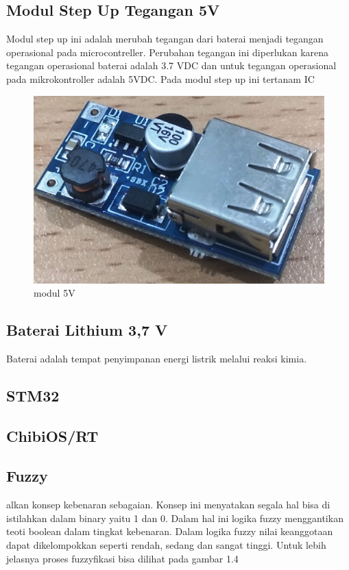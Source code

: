 \documentclass[11pt]{article}
\begin{document}
\subsection{Modul Step Up Tegangan 5V}
Modul step up ini adalah merubah tegangan dari baterai menjadi tegangan operasional pada microcontreller.
Perubahan tegangan ini diperlukan karena tegangan operasional baterai adalah 3.7 VDC dan untuk tegangan operasional pada mikrokontroller adalah 5VDC.
Pada modul step up ini tertanam IC 
\begin{figure}[!h]
	\centering
	\captionsetup{justification=centering}
	\includegraphics[width=0.7\linewidth]{dokumentasi/modul5v.jpg}
	\caption[modulcharging]{\small{modul 5V}}
\end{figure}
\subsection{Baterai Lithium 3,7 V}
Baterai adalah tempat penyimpanan energi listrik melalui reaksi kimia. 

\subsection{STM32}

\subsection{ChibiOS/RT}

\subsection{Fuzzy}
alkan konsep kebenaran sebagaian.
Konsep ini menyatakan segala hal bisa di istilahkan dalam binary yaitu 1 dan 0.
Dalam hal ini logika fuzzy menggantikan teoti boolean dalam tingkat kebenaran.
Dalam logika fuzzy nilai keanggotaan dapat dikelompokkan seperti rendah, sedang dan sangat tinggi.
Untuk lebih jelasnya proses fuzzyfikasi bisa dilihat pada gambar 1.4
\end{document}
